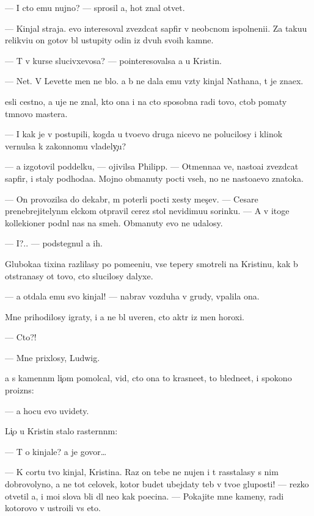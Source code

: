 \documentclass[10pt]{book}
\begin{document}
— I cto {\y}emu nujno? — sprosil {\y}a, hot{\ia} znal otvet.

— Kinjal straja. {\Y}evo interesoval zvezd\-ca\-t{\yi}{\y} sapfir v neob{\yi}cnom ispolneni{\y}i. Za taku{\y}u relikvi{\y}u on gotov b{\yi}l ustupity odin iz dvuh svo{\y}ih kamne{\y}.

— T{\yi} v kurse slucivxevosa? — pointeresovalsa {\y}a u Kristin{\yi}.

— Net. V Levette men{\ia} ne b{\yi}lo. {\Y}a b{\yi} ne dala {\y}emu vz{\ia}ty kinjal Nathana, t{\yi} je zna\-{\y}ex.

{\Y}esli cestno, {\y}a uje ne znal, kto ona i na cto sposobna radi tovo, ctob{\yi} po{\y}maty t{\e}mnovo mastera.

— I kak je v{\yi} postupili, kogda u tvo{\y}evo druga nicevo ne polucilosy i klinok vernulsa k zakonnomu vladely{\c}u?

— {\Y}a izgotovil poddelku, — ojivilsa Philipp. — Otmenna{\y}a ve{\x}, nasto{\y}a{\x}i{\y} zvezd\-ca\-t{\yi}{\y} sapfir, i staly podhod{\ia}{\x}a{\y}a. Mojno obmanuty pocti vseh, no ne nasto{\y}a{\x}evo znatoka.

— On provozilsa do dekabr{\ia}, m{\yi} poter{\ia}li pocti xesty mes{\ia}{\c}ev. — Cesare pre\-nebreji\-tely\-n{\yi}m {\x}elckom otpravil cerez stol nevidimu{\y}u sorinku. — A v itoge kollek\-{\c}ioner podn{\ia}l nas na smeh. Obmanuty {\y}evo ne udalosy.

— I?.. — podstegnul {\y}a ih.

Gluboka{\y}a tixina razlilasy po pome{\x}eni{\y}u, vse tepery smotreli na Kristinu, kak b{\yi} otstran{\ia}{\y}asy ot tovo, cto slucilosy dalyxe.

— {\Y}a otdala {\y}emu svo{\y} kinjal! — nabrav vozduha v grudy, v{\yi}palila ona.

Mne prihodilosy igraty, i {\y}a ne b{\yi}l uveren, cto akt{\e}r iz men{\ia} horoxi{\y}.

— Cto?!

— Mne pri\-xlosy, Ludwig.

{\Y}a s kamenn{\yi}m li{\c}om pomolcal, vid{\ia}, cto ona to krasne{\y}et, to bledne{\y}et, i spo\-ko{\y}\-no proizn{\e}s:

— {\Y}a hocu {\y}evo uvidety.

Li{\c}o u Kristin{\yi} stalo raster{\ia}nn{\yi}m:

— T{\yi} o kinjale? {\Y}a je govor{\io}…

— K cortu tvo{\y} kinjal, Kristina. Raz on tebe ne nujen i t{\yi} rasstalasy s nim dobrovolyno, {\y}a ne tot celovek, kotor{\yi}{\y} budet ubejdaty teb{\ia} v tvo{\y}e{\y} gluposti! — rezko otvetil {\y}a, i mo{\y}i slova b{\yi}li dl{\ia} ne{\y}o kak po{\x}ecina. — Pokajite mne kameny, radi kotorovo v{\yi} ustro{\y}ili vs{\e} eto.
\end{document}
